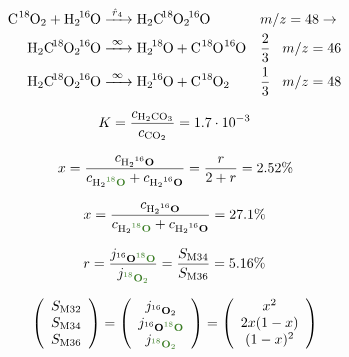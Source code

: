 \documentclass{article}
\begin{document}
\begin{align}
\ce{C^{18}O2 + H2\!^{16}O &->[\hat{r}_4] H2C\!^{18}O2\!^{16}O} && m/z=48 \rightarrow \\
\ce{H2C\!^{18}O2\!^{16}O &->[\infty] H2\!^{18}O + C^{18}O^{16}O } && \frac{2}{3} \hspace{3mm} m/z=46 \\
\ce{H2C\!^{18}O2\!^{16}O &->[\infty] H2\!^{16}O + C^{18}O2} && \frac{1}{3} \hspace{3mm} m/z=48
\end{align}


\begin{equation}
K = \frac{c_{\ce{H2CO3}}}{c_{\ce{CO2}}} = 1.7 \cdot 10^{-3}
\end{equation}

\begin{equation}
x = \frac{c_\text{H$_2$\textbf{$^{16}$O}}}{c_\text{H$_2$\textbf{\textcolor{OliveGreen}{$^{18}$O}}} + c_\text{H$_2$\textbf{$^{16}$O}}} = \frac{r}{2+r} = 2.52\%
\end{equation}

\begin{equation}
x = \frac{c_\text{H$_2$\textbf{$^{16}$O}}}{c_\text{H$_2$\textbf{\textcolor{OliveGreen}{$^{18}$O}}} + c_\text{H$_2$\textbf{$^{16}$O}}} = 27.1\%
\end{equation}

\begin{equation}
r =  \frac{j_\text{\textbf{$^{16}$O\textcolor{OliveGreen}{$^{18}$O}}}}{j_\text{\textbf{\textcolor{OliveGreen}{$^{18}$O$_2$}}}} = \frac{S_\text{M34}}{S_\text{M36}} = 5.16\%
\end{equation}

\begin{equation}
\left( \begin{array}{c}  S_\text{M32} \\ S_\text{M34}\\ S_\text{M36} 
\end{array}  \right)
= 
\left( \begin{array}{c}  j_\text{\textbf{{$^{16}$O$_2$}}} \\ j_\text{\textbf{$^{16}$O\textcolor{OliveGreen}{$^{18}$O}}} \\ j_\text{\textbf{\textcolor{OliveGreen}{$^{18}$O$_2$}}} 
\end{array}  \right)
= 
\left( \begin{array}{c}  x^2 \\ 2x(1-x)\\ (1-x)^2 
\end{array}  \right)
\end{equation}
\end{document}
